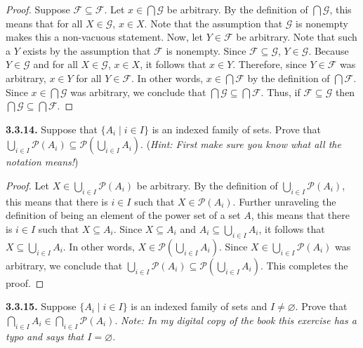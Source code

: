 \documentclass[12pt]{amsart}
\newenvironment{statement}[1]{\smallskip\noindent\color[rgb]{.6627, .3529, .6314} {\bf #1.}}{}
\theoremstyle{definition}
\theoremstyle{remark}
\newcommand{\powerset}[1]{\mathscr{P} \left( #1 \right)}
\begin{document}
\begin{proof}
Suppose $\mathcal{F} \subseteq \mathcal{F}$.
Let $x \in \bigcap \mathcal{G}$ be arbitrary.
By the definition of $\bigcap \mathcal{G}$, this means that for all $X \in \mathcal{G}$, $x \in X$.
Note that the assumption that $\mathcal{G}$ is nonempty makes this a non-vacuous statement.
Now, let $Y \in \mathcal{F}$ be arbitrary.
Note that such a $Y$ exists by the assumption that $\mathcal{F}$ is nonempty.
Since $\mathcal{F} \subseteq \mathcal{G}$, $Y \in \mathcal{G}$.
Because $Y \in \mathcal{G}$ and for all $X \in \mathcal{G}$, $x \in X$, it follows that $x \in Y$.
Therefore, since $Y \in \mathcal{F}$ was arbitrary, $x \in Y$ for all $Y \in \mathcal{F}$.
In other words, $x \in \bigcap \mathcal{F}$ by the definition of $\bigcap \mathcal{F}$.
Since $x \in \bigcap \mathcal{G}$ was arbitrary, we conclude that $\bigcap \mathcal{G} \subseteq \bigcap \mathcal{F}$.
Thus, if $\mathcal{F} \subseteq \mathcal{G}$ then $\bigcap \mathcal{G} \subseteq \bigcap \mathcal{F}$.
\end{proof}


\begin{statement}{3.3.14}
Suppose that $\{ A_i \mid i \in I \}$ is an indexed family of sets.
Prove that $\bigcup_{i \in I} \powerset{A_i} \subseteq \powerset{\bigcup_{i \in I} A_i}$.
(\emph{Hint: First make sure you know what all the notation means!})
\end{statement}

\begin{proof}
Let $X \in \bigcup_{i \in I} \powerset{A_i}$ be arbitrary.
By the definition of $\bigcup_{i \in I} \powerset{A_i}$, this means that there is $i \in I$ such that $X \in \powerset{A_i}$.
Further unraveling the definition of being an element of the power set of a set $A$, this means that there is $i \in I$ such that $X \subseteq A_i$.
Since $X \subseteq A_i$ and $A_i \subseteq \bigcup_{i \in I} A_i$, it follows that $X \subseteq \bigcup_{i \in I} A_i$.
In other words, $X \in \powerset{\bigcup_{i \in I} A_i}$.
Since $X \in \bigcup_{i \in I} \powerset{A_i}$ was arbitrary, we conclude that $\bigcup_{i \in I} \powerset{A_i} \subseteq \powerset{\bigcup_{i \in I} A_i}$.
This completes the proof.
\end{proof}


\begin{statement}{3.3.15}
Suppose $\{ A_i \mid i \in I \}$ is an indexed family of sets and $I \neq \varnothing$.
Prove that $\bigcap_{i \in I} A_i \in \bigcap_{i \in I} \powerset{A_i}$.
\emph{Note: In my digital copy of the book this exercise has a typo and says that $I = \varnothing$.}
\end{statement}
\end{document}
